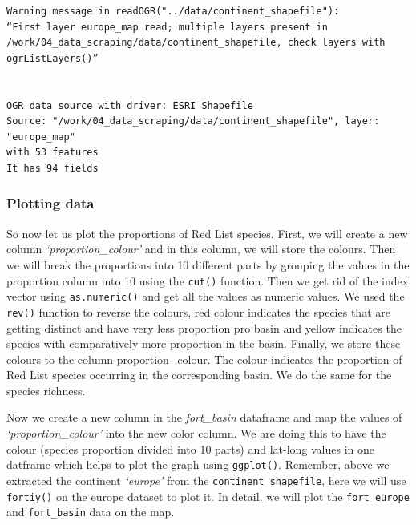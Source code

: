 \documentclass[
]{book}
\newenvironment{Shaded}{\begin{snugshade}}{\end{snugshade}}
\newcommand{\DataTypeTok}[1]{\textcolor[rgb]{0.13,0.29,0.53}{#1}}
\newcommand{\DecValTok}[1]{\textcolor[rgb]{0.00,0.00,0.81}{#1}}
\newcommand{\KeywordTok}[1]{\textcolor[rgb]{0.13,0.29,0.53}{\textbf{#1}}}
\newcommand{\NormalTok}[1]{#1}
\newcommand{\OperatorTok}[1]{\textcolor[rgb]{0.81,0.36,0.00}{\textbf{#1}}}
\newcommand{\StringTok}[1]{\textcolor[rgb]{0.31,0.60,0.02}{#1}}
\begin{document}
\begin{verbatim}
Warning message in readOGR("../data/continent_shapefile"):
“First layer europe_map read; multiple layers present in
/work/04_data_scraping/data/continent_shapefile, check layers with ogrListLayers()”


OGR data source with driver: ESRI Shapefile 
Source: "/work/04_data_scraping/data/continent_shapefile", layer: "europe_map"
with 53 features
It has 94 fields
\end{verbatim}

\hypertarget{plotting-data}{%
\subsubsection*{Plotting data}\label{plotting-data}}

So now let us plot the proportions of Red List species. First, we will create a new column \emph{`proportion\_colour'} and in this column, we will store the colours. Then we will break the proportions into 10 different parts by grouping the values in the proportion column into 10 using the \texttt{cut()} function. Then we get rid of the index vector using \texttt{as.numeric()} and get all the values as numeric values. We used the \texttt{rev()} function to reverse the colours, red colour indicates the species that are getting distinct and have very less proportion pro basin and yellow indicates the species with comparatively more proportion in the basin. Finally, we store these colours to the column proportion\_colour. The colour indicates the proportion of Red List species occurring in the corresponding basin. We do the same for the species richness.

\begin{Shaded}
\end{Shaded}

Now we create a new column in the \emph{fort\_basin} dataframe and map the values of \emph{`proportion\_colour'} into the new color column. We are doing this to have the colour (species proportion divided into 10 parts) and lat-long values in one datframe which helps to plot the graph using \texttt{ggplot()}. Remember, above we extracted the continent \emph{`europe'} from the \texttt{continent\_shapefile}, here we will use \texttt{fortiy()} on the europe dataset to plot it. In detail, we will plot the \texttt{fort\_europe} and \texttt{fort\_basin} data on the map.
\end{document}
